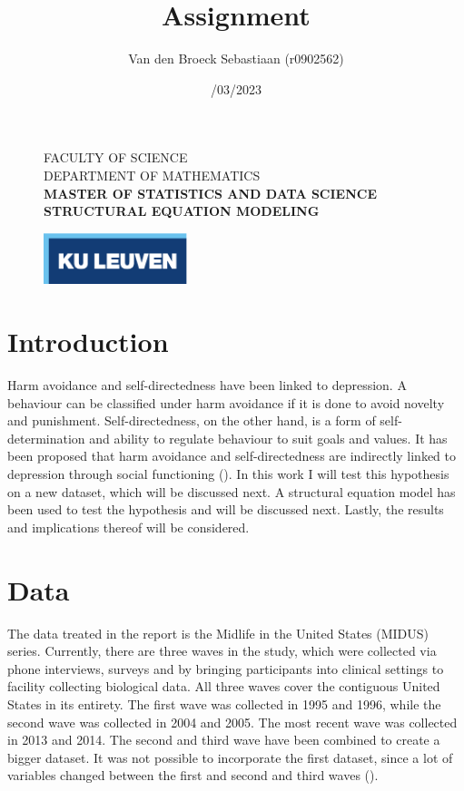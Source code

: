 \documentclass[11pt]{article}
\title{\vspace*{40.0mm}
  \bf\sf Assignment
         \vspace*{20.0mm} \\
  \vspace*{40.0mm}}
\author{\sf Van den Broeck Sebastiaan (r0902562)}
\date{\sf 13/03/2023}
\begin{document}
\begin{figure}
  \parbox[t]{125mm}{
    \vspace*{6mm}
    \scriptsize\sf           FACULTY OF SCIENCE \\
    \scriptsize\sf           DEPARTMENT OF MATHEMATICS \\
    \scriptsize\sf\bfseries  MASTER OF STATISTICS AND DATA SCIENCE \\
    \scriptsize\sf\bfseries  STRUCTURAL EQUATION MODELING \\}
  \parbox[t]{40mm}{
    \begin{flushright}
      \includegraphics[height=15mm]{logo.eps.pdf}
    \end{flushright}}
\end{figure}

\maketitle
\thispagestyle{empty}
\raggedbottom

\cleardoublepage
\setcounter{page}{1}
\setcounter{tocdepth}{3}

\section{Introduction}

Harm avoidance and self-directedness have been linked to depression.
A behaviour can be classified under harm avoidance if it is done to avoid novelty and punishment.
Self-directedness, on the other hand, is a form of self-determination and ability to regulate behaviour to suit goals and values.
It has been proposed that harm avoidance and self-directedness are indirectly linked to depression through social functioning (\cite{tse2011}).
In this work I will test this hypothesis on a new dataset, which will be discussed next.
A structural equation model has been used to test the hypothesis and will be discussed next.
Lastly, the results and implications thereof will be considered.

\section{Data}

The data treated in the report is the Midlife in the United States (MIDUS) series.
Currently, there are three waves in the study, which were collected via phone interviews, surveys and by bringing participants into clinical settings to facility collecting biological data.
All three waves cover the contiguous United States in its entirety.
The first wave was collected in 1995 and 1996, while the second wave was collected in 2004 and 2005.
The most recent wave was collected in 2013 and 2014.
The second and third wave have been combined to create a bigger dataset.
It was not possible to incorporate the first dataset, since a lot of variables changed between the first and second and third waves (\cite{radler2014}).
\end{document}
